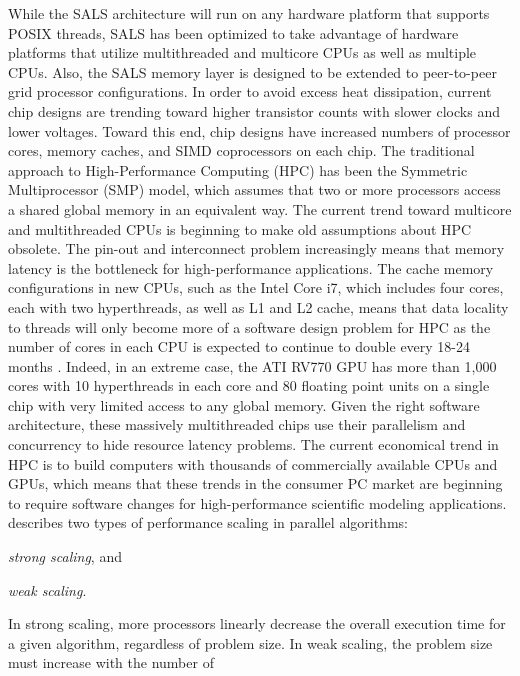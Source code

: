 While the SALS architecture will run on any hardware platform that
supports POSIX threads, SALS has been optimized to take advantage of
hardware platforms that utilize multithreaded and multicore CPUs as
well as multiple CPUs.  Also, the SALS memory layer is designed to be
extended to peer-to-peer grid processor configurations.  In order to
avoid excess heat dissipation, current chip designs are trending
toward higher transistor counts with slower clocks and lower voltages.
Toward this end, chip designs have increased numbers of processor
cores, memory caches, and SIMD coprocessors on each chip.  The
traditional approach to High-Performance Computing (HPC) has been the
Symmetric Multiprocessor (SMP) model, which assumes that two or more
processors access a shared global memory in an equivalent way.  The
current trend toward multicore and multithreaded CPUs is beginning to
make old assumptions about HPC obsolete.  The pin-out and interconnect
problem increasingly means that memory latency is the bottleneck for
high-performance applications.  The cache memory configurations in new
CPUs, such as the Intel Core i7, which includes four cores, each with
two hyperthreads, as well as L1 and L2 cache, means that data locality
to threads will only become more of a software design problem for HPC
as the number of cores in each CPU is expected to continue to double
every 18-24 months \cite[]{sodan:2010,dongarra:2007}.  Indeed, in an
extreme case, the ATI RV770 GPU has more than 1,000 cores with 10
hyperthreads in each core and 80 floating point units on a single chip
with very limited access to any global memory.  Given the right
software architecture, these massively multithreaded chips use their
parallelism and concurrency to hide resource latency problems.  The
current economical trend in HPC is to build computers with thousands
of commercially available CPUs and GPUs, which means that these trends
in the consumer PC market are beginning to require software changes
for high-performance scientific modeling applications.
\cite{sodan:2010} describes two types of performance scaling in
parallel algorithms:
\begin{packed_enumerate}
\item{{\emph{strong scaling}}, and}
\item{{\emph{weak scaling}}.}
\end{packed_enumerate}
In strong scaling, more processors linearly decrease the overall
execution time for a given algorithm, regardless of problem size.  In
weak scaling, the problem size must increase with the number of
